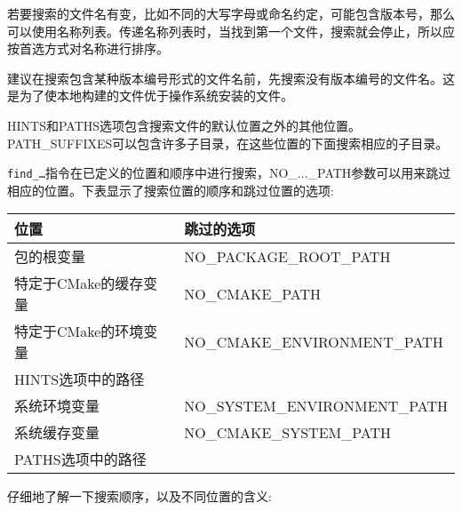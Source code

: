 若要搜索的文件名有变，比如不同的大写字母或命名约定，可能包含版本号，那么可以使用名称列表。传递名称列表时，当找到第一个文件，搜索就会停止，所以应按首选方式对名称进行排序。

\begin{tcolorbox}[colback=blue!5!white,colframe=blue!75!black,title=搜索包含版本号的文件]
建议在搜索包含某种版本编号形式的文件名前，先搜索没有版本编号的文件名。这是为了使本地构建的文件优于操作系统安装的文件。
\end{tcolorbox}

HINTS和PATHS选项包含搜索文件的默认位置之外的其他位置。PATH\_SUFFIXES可以包含许多子目录，在这些位置的下面搜索相应的子目录。

\texttt{find\_…}指令在已定义的位置和顺序中进行搜索，NO\_...\_PATH参数可以用来跳过相应的位置。下表显示了搜索位置的顺序和跳过位置的选项:

\begin{table}[H]
	\centering
	\begin{tabular}{|l|l|}
		\hline
		\textbf{位置}                     & \textbf{跳过的选项} \\ \hline
		包的根变量                & NO\_PACKAGE\_ROOT\_PATH                 \\ \hline
		特定于CMake的缓存变量        & NO\_CMAKE\_PATH                         \\ \hline
		特定于CMake的环境变量  & NO\_CMAKE\_ENVIRONMENT\_PATH            \\ \hline
		HINTS选项中的路径           &                                         \\ \hline
		系统环境变量 & NO\_SYSTEM\_ENVIRONMENT\_PATH           \\ \hline
		系统缓存变量       & NO\_CMAKE\_SYSTEM\_PATH                 \\ \hline
		PATHS选项中的路径           &                                         \\ \hline
	\end{tabular}
\end{table}

仔细地了解一下搜索顺序，以及不同位置的含义:

